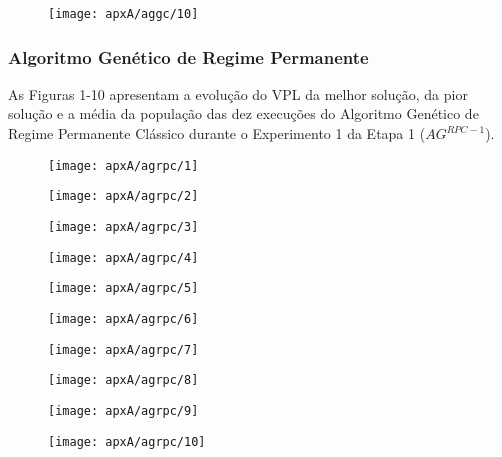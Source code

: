 \begin{figure}[H]
\centering
\label{fig:graphGC1-10}
\texttt{[image: apxA/aggc/10]}
\end{figure}

\subsubsection{Algoritmo Genético de Regime Permanente}
As Figuras 1-10 apresentam a evolução do VPL da melhor solução, da pior solução e a média da população das dez execuções do Algoritmo Genético de Regime Permanente Clássico durante o Experimento 1 da Etapa 1 ($AG^{RPC-1}$).

\begin{figure}[H]
\centering

\texttt{[image: apxA/agrpc/1]}
\end{figure}

\begin{figure}[H]
\centering

\texttt{[image: apxA/agrpc/2]}
\end{figure}

\begin{figure}[H]
\centering

\texttt{[image: apxA/agrpc/3]}
\end{figure}

\begin{figure}[H]
\centering

\texttt{[image: apxA/agrpc/4]}
\end{figure}

\begin{figure}[H]
\centering

\texttt{[image: apxA/agrpc/5]}
\end{figure}

\begin{figure}[H]
\centering

\texttt{[image: apxA/agrpc/6]}
\end{figure}

\begin{figure}[H]
\centering

\texttt{[image: apxA/agrpc/7]}
\end{figure}

\begin{figure}[H]
\centering

\texttt{[image: apxA/agrpc/8]}
\end{figure}

\begin{figure}[H]
\centering

\texttt{[image: apxA/agrpc/9]}
\end{figure}

\begin{figure}[H]
\centering

\texttt{[image: apxA/agrpc/10]}
\end{figure}